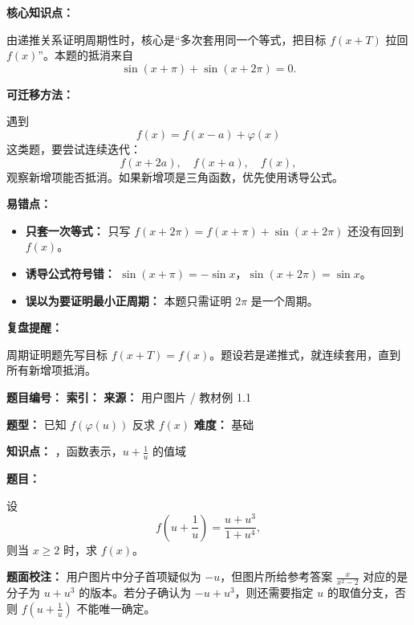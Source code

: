 \begin{knowledgeBox}
\textbf{核心知识点：}

由递推关系证明周期性时，核心是“多次套用同一个等式，把目标 \(f(x+T)\) 拉回 \(f(x)\)”。本题的抵消来自
\[
\sin(x+\pi)+\sin(x+2\pi)=0.
\]

\textbf{可迁移方法：}

遇到
\[
f(x)=f(x-a)+\varphi(x)
\]
这类题，要尝试连续迭代：
\[
f(x+2a),\quad f(x+a),\quad f(x),
\]
观察新增项能否抵消。如果新增项是三角函数，优先使用诱导公式。
\end{knowledgeBox}

\begin{mistakeBox}
\textbf{易错点：}

\begin{itemize}
  \item \textbf{只套一次等式：} 只写 \(f(x+2\pi)=f(x+\pi)+\sin(x+2\pi)\) 还没有回到 \(f(x)\)。
  \item \textbf{诱导公式符号错：} \(\sin(x+\pi)=-\sin x\)，\(\sin(x+2\pi)=\sin x\)。
  \item \textbf{误以为要证明最小正周期：} 本题只需证明 \(2\pi\) 是一个周期。
\end{itemize}

\textbf{复盘提醒：}

周期证明题先写目标 \(f(x+T)=f(x)\)。题设若是递推式，就连续套用，直到所有新增项抵消。
\end{mistakeBox}


\begin{problemBox}
\begin{problemMeta}
\textbf{题目编号：}  \quad
\textbf{索引：}  \quad
\textbf{来源：} 用户图片 / 教材例 1.1

\textbf{题型：} 已知 \(f(\varphi(u))\) 反求 \(f(x)\) \quad
\textbf{难度：} 基础

\textbf{知识点：} ，函数表示，\(u+\frac{1}{u}\) 的值域
\end{problemMeta}

\textbf{题目：}

设
\[
f\left(u+\frac{1}{u}\right)=\frac{u+u^3}{1+u^4},
\]
则当 \(x\ge 2\) 时，求 \(f(x)\)。

\textbf{题面校注：} 用户图片中分子首项疑似为 \(-u\)，但图片所给参考答案 \(\frac{x}{x^2-2}\) 对应的是分子为 \(u+u^3\) 的版本。若分子确认为 \(-u+u^3\)，则还需要指定 \(u\) 的取值分支，否则 \(f\left(u+\frac{1}{u}\right)\) 不能唯一确定。
\end{problemBox}

